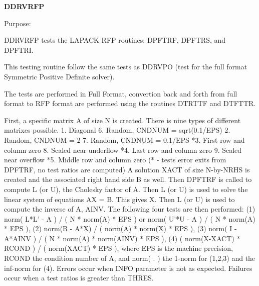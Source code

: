 {\bfseries D\+D\+R\+V\+R\+F\+P} 

\begin{DoxyParagraph}{Purpose\+: }
\begin{DoxyVerb} DDRVRFP tests the LAPACK RFP routines:
     DPFTRF, DPFTRS, and DPFTRI.

 This testing routine follow the same tests as DDRVPO (test for the full
 format Symmetric Positive Definite solver).

 The tests are performed in Full Format, convertion back and forth from
 full format to RFP format are performed using the routines DTRTTF and
 DTFTTR.

 First, a specific matrix A of size N is created. There is nine types of 
 different matrixes possible.
  1. Diagonal                        6. Random, CNDNUM = sqrt(0.1/EPS)
  2. Random, CNDNUM = 2              7. Random, CNDNUM = 0.1/EPS
 *3. First row and column zero       8. Scaled near underflow
 *4. Last row and column zero        9. Scaled near overflow
 *5. Middle row and column zero
 (* - tests error exits from DPFTRF, no test ratios are computed)
 A solution XACT of size N-by-NRHS is created and the associated right
 hand side B as well. Then DPFTRF is called to compute L (or U), the
 Cholesky factor of A. Then L (or U) is used to solve the linear system
 of equations AX = B. This gives X. Then L (or U) is used to compute the
 inverse of A, AINV. The following four tests are then performed:
 (1) norm( L*L' - A ) / ( N * norm(A) * EPS ) or
     norm( U'*U - A ) / ( N * norm(A) * EPS ),
 (2) norm(B - A*X) / ( norm(A) * norm(X) * EPS ),
 (3) norm( I - A*AINV ) / ( N * norm(A) * norm(AINV) * EPS ),
 (4) ( norm(X-XACT) * RCOND ) / ( norm(XACT) * EPS ),
 where EPS is the machine precision, RCOND the condition number of A, and
 norm( . ) the 1-norm for (1,2,3) and the inf-norm for (4).
 Errors occur when INFO parameter is not as expected. Failures occur when
 a test ratios is greater than THRES.\end{DoxyVerb}
 
\end{DoxyParagraph}

